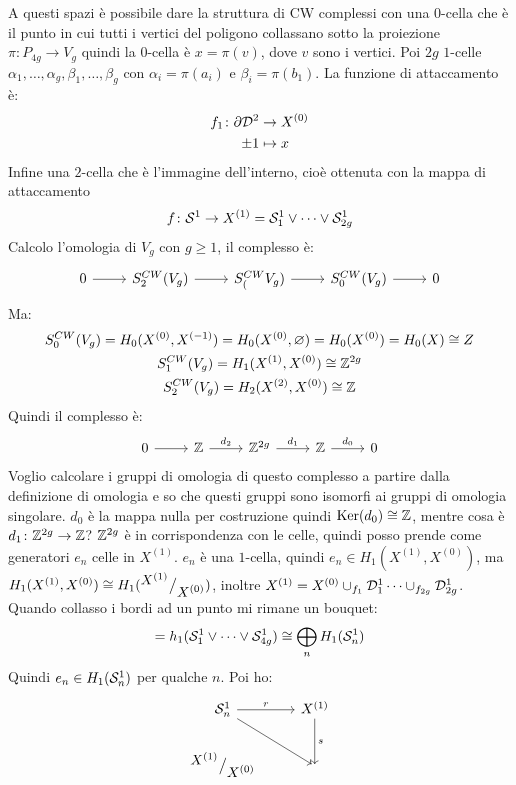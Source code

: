 A questi spazi è possibile dare la struttura di CW complessi
con una $ 0 $-cella che è il punto in cui tutti i vertici del
poligono collassano sotto la proiezione $ \pi \colon P_{4g} \to V_g $
quindi la $ 0 $-cella è $ x = \pi(v) $, dove $ v $ sono i vertici.
Poi $ 2 g $ $ 1 $-celle $ \alpha_1, \dots, \alpha_g, \beta_1, \dots, \beta_g $ con
$ \alpha_i = \pi(a_i) $ e $ \beta_i = \pi(b_1) $. La funzione di attaccamento
è:
\begin{align*}
  f_1 \colon \partial \mathcal{D}^{2} & \to X^{(0)} \\
  \pm 1 & \mapsto x
\end{align*}
Infine una $ 2 $-cella
che è l'immagine dell'interno, cioè ottenuta con la mappa
di attaccamento
\[
  f \colon \mathcal{S}^{1} \to X^{(1)} = \mathcal{S}^{1}_1 \vee \dots \vee \mathcal{S}^{1}_{2g}
\]
Calcolo l'omologia di $ V_g $ con $ g \geq 1 $, il complesso
è:
\[
  \begin{tikzcd}
    0 \rar & S^{CW}_2(V_g) \rar & S^{CW}_(V_g) \rar & S^{CW}_0(V_g) \rar & 0
  \end{tikzcd}
\]
Ma:
\begin{gather*}
  S^{CW}_0(V_g) = H_0(X^{(0)}, X^{(-1)}) = H_0(X^{(0)}, \varnothing) = H_0(X^{(0)}) = H_0(X) \cong Z \\
  S^{CW}_1(V_g) = H_1(X^{(1)}, X^{(0)}) \cong \mathbb{Z}^{2g} \\
  S^{CW}_2(V_g) = H_2(X^{(2)}, X^{(0)}) \cong \mathbb{Z}
\end{gather*}
Quindi il complesso è:
\[
  \begin{tikzcd}
    0 \rar & \Z \rar{d_2} & \Z^{2g} \rar{d_1} & \Z \rar{d_0} & 0
  \end{tikzcd}
\]
Voglio calcolare i gruppi di omologia di questo complesso a partire dalla
definizione di omologia e so che questi gruppi sono isomorfi ai gruppi di
omologia singolare. $ d_0 $ è la mappa nulla per costruzione quindi
$ \mathrm{Ker}( d_0) \cong \mathbb{Z} $, mentre cosa è $ d_1 \colon \mathbb{Z}^{2g} \to \mathbb{Z} $? $ \mathbb{Z}^{2g} $ è in
corrispondenza con le celle, quindi posso prende come generatori $ e_n $ celle
in $ X^{(1)} $. $ e_n $ è una $ 1 $-cella, quindi
$ e_n \in H_1(X^{(1)}, X^{(0)}) $, ma
$ H_1(X^{(1)}, X^{(0)}) \cong H_1({^{\textstyle X^{(1)}}\big/_{\textstyle X^{(0)}}}) $, inoltre
$ X^{(1)} = X^{(0)} \cup_{f_1} \mathcal{D}^{1}_1 \dots \cup_{f_{2g}} \mathcal{D}^{1}_{2g} $. Quando
collasso i bordi ad un punto mi rimane un bouquet:
\[
  = h_1(\mathcal{S}^{1}_1 \vee \dots \vee \mathcal{S}^{1}_{4g}) \cong \bigoplus_n H_1(\mathcal{S}^{1}_n)
\]
Quindi $ e_n \in H_1(\mathcal{S}^{1}_n) $ per qualche $ n $. Poi ho:
\[
  \begin{tikzcd}
    \Sph{1}_n \rar{r} \arrow{dr}{} & X^{(1)} \dar{s} \\
    \quot{X^{(1)}}{X^{(0)}} & {}
  \end{tikzcd}
\]
